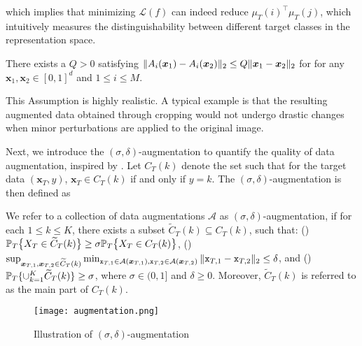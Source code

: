 which implies that minimizing $\mathcal{L}(f)$ can indeed reduce $\mu_T(i)^\top\mu_T(j)$, which intuitively measures the distinguishability between different target classes in the representation space.
\begin{assumption}\label{assumption: Lip augmentation}
    There exists a $Q > 0$ satisfying $\norm{A_i(\bm{x}_1) - A_i(\bm{x}_2)}_2 \leq Q\norm{\bm{x}_1 - \bm{x}_2}_2$ for for any $\bm{x}_1, \bm{x}_2 \in [0,1]^d$ and $1\leq i \leq M$.
\end{assumption}
This Assumption is highly realistic. A typical example is that the resulting augmented data obtained through cropping would not undergo drastic changes when minor perturbations are applied to the original image.

Next, we introduce the $(\sigma, \delta)$-augmentation to quantify the quality of data augmentation, inspired by \citet{huang2023towards}. Let $C_T(k)$ denote the set such that for the target data $(\bm{x}_T,y)$, $\bm{x}_T \in C_T(k)$ if and only if $y = k$. The $(\sigma, \delta)$-augmentation is then defined as 
\begin{definition}
\label{def: (σ,δ)-augmentation}
We refer to a collection of data augmentations $\mathcal{A}$ as $(\sigma, \delta)$-augmentation, if for each $1 \leq k \leq K$, there exists a subset $\widetilde{C}_T(k) \subseteq C_T(k)$, such that: () $\P_T\big\{X_T \in \widetilde{C}_T(k)\big\} \geq \sigma \P_T\big\{X_T \in C_T(k)\big\}$, () $\sup_{\bm{x}_{T, 1},\bm{x}_{T, 2} \in \widetilde{C}_T(k)}\min_{\mathtt{x}_{T, 1} \in \mathcal{A}(\bm{x}_{T, 1}), \mathtt{x}_{T, 2} \in \mathcal{A}(\bm{x}_{T, 2})}\norm{\mathtt{x}_{T, 1} - \mathtt{x}_{T, 2}}_2 \leq \delta$, and () 
$\P_T\{\cup_{k=1}^K\widetilde{C}_T(k)\} \geq \sigma$, where $\sigma \in (0,1]$ and $\delta \geq 0$. Moreover, $\widetilde{C}_T(k)$ is referred to as the main part of $C_T(k)$.
\end{definition}
\begin{figure}[t]
    \centering
    \texttt{[image: augmentation.png]}
    \caption{Illustration of $(\sigma, \delta)$-augmentation}
    \label{fig: (σ,δ)-augmentation}
\end{figure}
